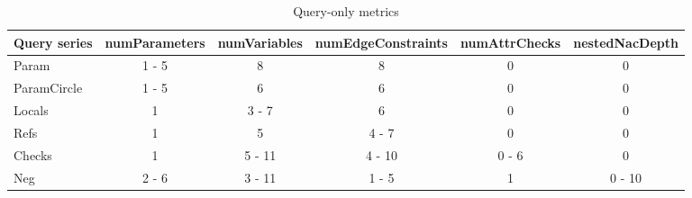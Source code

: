 \begin{table}[Htb]
	\centering
	\footnotesize
	\begin{tabular}{|l|c|c|c|c|c|}
	\hline 
	\textbf{Query series} & \textbf{numParameters} & \textbf{numVariables} &
	\textbf{numEdgeConstraints} & \textbf{numAttrChecks} &
	\textbf{nestedNacDepth}\\ \hline Param & \cellcolor{blue!25}1 - 5 & 8 & 8 & 0 & 0\\ \hline ParamCircle & \cellcolor{blue!25}1 - 5 & 6 & 6 & 0 & 0\\ \hline
	Locals & 1 & \cellcolor{blue!25}3 - 7 & 6 & 0 & 0\\ \hline
	Refs & 1 & 5 & \cellcolor{blue!25}4 - 7 & 0 & 0\\ \hline
	Checks & 1 & 5 - 11 & 4 - 10 & \cellcolor{blue!25}0 - 6 & 0\\ \hline
	Neg & 2 - 6 & 3 - 11 & 1 - 5 & 1 & \cellcolor{blue!25}0 - 10\\ \hline
	\end{tabular}
	\caption{Query-only metrics}
	\label{tab:queryonlymetrics}
\end{table}
